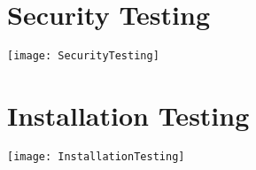 \begin{figure}
\section{Security Testing}
\centering
\texttt{[image: SecurityTesting]}
\end{figure}

\begin{figure}[!h]
\section{Installation Testing}
\centering
\texttt{[image: InstallationTesting]}
\end{figure}


